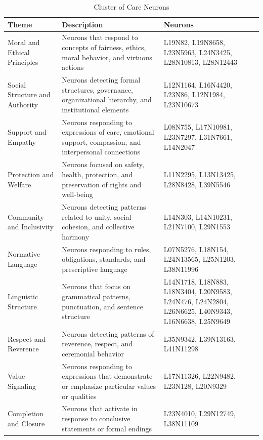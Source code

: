 \documentclass[runninghheads]{llncs}
\begin{document}
\begin{table}[!ht]
    \centering
    \caption{Cluster of Care Neurons}
    \begin{tabular}{|p{3cm}|p{5.5cm}|p{3.5cm}|}
   
    \hline
        \textbf{Theme} & \textbf{Description} & \textbf{Neurons} \\ \hline
        Moral and Ethical Principles & Neurons that respond to concepts of fairness, ethics, moral behavior, and virtuous actions & L19N82, L19N8658, L23N5963, L24N3425, L28N10813, L28N12443 \\ \hline
        Social Structure and Authority & Neurons detecting formal structures, governance, organizational hierarchy, and institutional elements & L12N1164, L16N4420, L23N86, L12N1984, L23N10673 \\ \hline
        Support and Empathy & Neurons responding to expressions of care, emotional support, compassion, and interpersonal connections & L08N755, L17N10981, L23N7297, L31N7661, L14N2047 \\ \hline
        Protection and Welfare & Neurons focused on safety, health, protection, and preservation of rights and well-being & L11N2295, L13N13425, L28N8428, L39N5546 \\ \hline
        Community and Inclusivity & Neurons detecting patterns related to unity, social cohesion, and collective harmony & L14N303, L14N10231, L21N7100, L29N1553 \\ \hline
        Normative Language & Neurons responding to rules, obligations, standards, and prescriptive language & L07N5276, L18N154, L24N13565, L25N1203, L38N11996 \\ \hline
        Linguistic Structure & Neurons that focus on grammatical patterns, punctuation, and sentence structure & L14N1718, L18N883, L18N3404, L20N9583, L24N476, L24N2804, L26N6625, L40N9343, L16N6638, L25N9649 \\ \hline
        Respect and Reverence & Neurons detecting patterns of reverence, respect, and ceremonial behavior & L35N9342, L39N13163, L41N11298 \\ \hline
        Value Signaling & Neurons responding to expressions that demonstrate or emphasize particular values or qualities & L17N11326, L22N9482, L23N128, L20N9329 \\ \hline
        Completion and Closure & Neurons that activate in response to conclusive statements or formal endings & L23N4010, L29N12749, L38N11109 \\ \hline
    \end{tabular}
    \label{tab:care}
\end{table}
\end{document}
